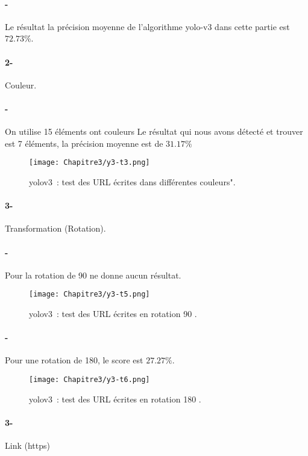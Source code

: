       \paragraph{-}Le résultat 
      la précision moyenne de l'algorithme yolo-v3 dans cette partie  est$72.73\%$.

      \paragraph{2-} Couleur.
      \paragraph{-}  On utilise 15 éléments ont couleurs
       Le résultat qui nous avons détecté et trouver est 7 éléments,  la précision moyenne est de  $31.17\%$
      \begin{figure}[H]
          \centering
           \texttt{[image: Chapitre3/y3-t3.png]}
           \caption{yolov3 : test des URL écrites dans différentes couleurs".}
           \label{y3_t3}
           \end{figure}
     
      \paragraph{3-} Transformation (Rotation).
      \paragraph{-} Pour la rotation de 90 ne donne aucun résultat.
      \begin{figure}[H]
          \centering
           \texttt{[image: Chapitre3/y3-t5.png]}
           \caption{yolov3 : test des URL écrites en rotation 90  .}
           \label{y3_t5}
           \end{figure}
     
      \paragraph{-} Pour une rotation de 180, le score est $27.27\%$.
      \begin{figure}[H]
          \centering
           \texttt{[image: Chapitre3/y3-t6.png]}
           \caption{yolov3 : test des URL écrites en rotation 180 .}
           \label{y3_t6}
           \end{figure}

      \paragraph{3-}Link (https)
